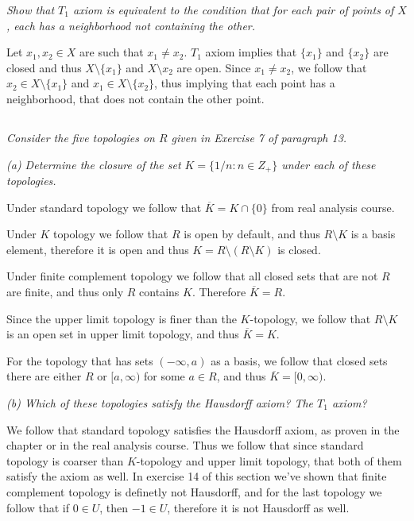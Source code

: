 \documentclass[11pt,oneside,titlepage]{book}
\newcommand{\set}[1]{\{ #1 \}}
\begin{document}
\textit{Show that $T_1$ axiom is equivalent to the condition that for each pair
  of points of $X$, each has a neighborhood not containing the other.}

Let $x_1, x_2 \in X$ are such that $x_1 \neq x_2$. $T_1$ axiom implies that
$\set{x_1}$ and $\set{x_2}$ are closed and thus $X \setminus \set{x_1}$ and
$X \setminus {x_2}$ are open. Since $x_1 \neq x_2$, we follow that
$x_2 \in X \setminus \set{x_1}$ and $x_1 \in X \setminus \set{x_2}$,
thus implying that each point has a neighborhood, that does not contain the other point.

\subsection{}

\textit{Consider the five topologies on $R$ given in Exercise 7 of paragraph 13.}

\textit{(a) Determine the closure of the set $K = \set{1/n: n \in Z_+}$ under each of
  these topologies.}

Under standard topology we follow that $\overline{K} = K \cap \set{0}$ from real
analysis course.

Under $K$ topology we follow that $R$ is open by default, and thus $R \setminus K$ is
a basis element, therefore it is open and thus $K = R \setminus (R \setminus K)$ is closed.

Under finite complement topology we follow that all closed sets that are not $R$ are
finite, and thus only $R$ contains $K$. Therefore $\overline{K} = R$. 

Since the upper limit topology is finer than the $K$-topology, we follow that
$R \setminus K$ is an open set in upper limit topology, and thus $\overline{K} = K$.

For the topology that has sets $(-\infty, a)$ as a basis, we follow that
closed sets there are either $R$ or $[a, \infty)$ for some $a \in R$, and thus
$\overline{K} = [0, \infty)$.

\textit{(b) Which of these topologies satisfy the Hausdorff axiom? The $T_1$ axiom?}

We follow that standard topology satisfies the Hausdorff axiom, as proven in the
chapter or in the real analysis course. Thus we follow that since standard topology
is coarser than $K$-topology and upper limit topology, that both of them
satisfy the axiom as well. In exercise 14 of this section we've shown that
finite complement topology is definetly not Hausdorff, and for the last topology
we follow that if $0 \in U$, then $-1 \in U$, therefore it is not Hausdorff as well.
\end{document}

